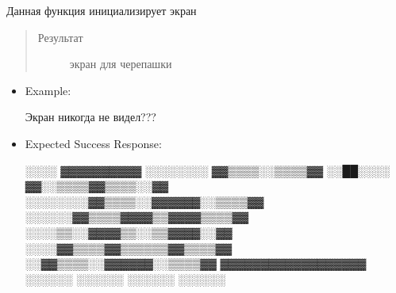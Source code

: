 \documentclass[a4paper,10pt,russian]{sphinxmanual}
\begin{document}
\begin{fulllineitems}
\label{\detokenize{index:display.create_screen}}
\pysigstartsignatures
{}
\pysigstopsignatures
\sphinxAtStartPar
{}

\sphinxAtStartPar
Данная функция инициализирует экран
\begin{quote}\begin{description}
\item[{Результат}] \leavevmode
\sphinxAtStartPar
экран для черепашки

\end{description}\end{quote}
\begin{itemize}
\item {} 
\sphinxAtStartPar
Example:

\begin{sphinxVerbatim}[commandchars=\\\{\}]
Экран никогда не видел???
\end{sphinxVerbatim}

\item {} 
\sphinxAtStartPar
Expected Success Response:

\begin{sphinxVerbatim}[commandchars=\\\{\}]
\PYGZhy{}\PYGZhy{}░░░░        ▓▓▓▓▓▓▓▓▓▓      
░░░░░░░░    ▓▓▒▒▒▒░░▒▒▒▒▓▓    
░░██░░░░  ▓▓░░▒▒▒▒▓▓▒▒▒▒░░▓▓  
░░░░░░░░▓▓▒▒▒▒░░▓▓▓▓▓▓░░▒▒▒▒▓▓
\PYGZhy{}\PYGZhy{}░░░░░░▓▓▒▒▒▒▓▓▓▓▒▒▓▓▓▓▒▒▒▒▓▓
\PYGZhy{}\PYGZhy{}\PYGZhy{}\PYGZhy{}░░░░▒▒░░▓▓▓▓▒▒░░▒▒▓▓▓▓░░▓▓
\PYGZhy{}\PYGZhy{}\PYGZhy{}\PYGZhy{}░░░░▓▓▒▒▒▒▓▓▒▒▒▒▒▒▓▓▒▒▒▒▓▓
\PYGZhy{}\PYGZhy{}\PYGZhy{}\PYGZhy{}\PYGZhy{}\PYGZhy{}░░▓▓▒▒▒▒░░▓▓▓▓▓▓░░▒▒▒▒▓▓
\PYGZhy{}\PYGZhy{}\PYGZhy{}\PYGZhy{}\PYGZhy{}\PYGZhy{}\PYGZhy{}\PYGZhy{}\PYGZhy{}▓▓▓▓▓▓▓▓▓▓▓▓▓▓▓▓▓▓  
\PYGZhy{}\PYGZhy{}\PYGZhy{}\PYGZhy{}\PYGZhy{}\PYGZhy{}\PYGZhy{}\PYGZhy{}\PYGZhy{}░░░░░░      ░░░░░░  
\PYGZhy{}\PYGZhy{}\PYGZhy{}\PYGZhy{}\PYGZhy{}\PYGZhy{}\PYGZhy{}\PYGZhy{}\PYGZhy{}░░░░░░      ░░░░░░ 
\end{sphinxVerbatim}

\end{itemize}

\end{fulllineitems}

\end{document}
